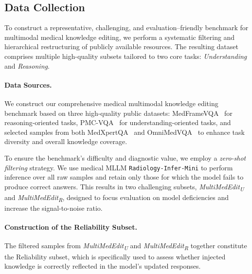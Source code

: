 \documentclass[letterpaper]{article} %
\begin{document}
\subsection{Data Collection}
To construct a representative, challenging, and evaluation–friendly benchmark for multimodal medical knowledge editing, we perform a systematic filtering and hierarchical restructuring of publicly available resources. The resulting dataset comprises multiple high-quality subsets tailored to two core tasks: \textit{Understanding} and \textit{Reasoning}.



\paragraph{Data Sources.}
We construct our comprehensive medical multimodal knowledge editing benchmark based on three high-quality public datasets: MedFrameVQA~\citep{liu2024medframeqa} for reasoning-oriented tasks, PMC-VQA~\citep{he2023pmcvqa} for understanding-oriented tasks, and selected samples from both MedXpertQA~\citep{cheng2024medxpertqa} and OmniMedVQA~\citep{huang2024omnimedvqa} to enhance task diversity and overall knowledge coverage.


To ensure the benchmark’s difficulty and diagnostic value, we employ a \textit{zero-shot filtering} strategy. We use medical MLLM \texttt{Radiology-Infer-Mini} to perform inference over all raw samples and retain only those for which the model fails to produce correct answers. This results in two challenging subsets, \textit{MultiMedEdit\textsubscript{U}} and \textit{MultiMedEdit\textsubscript{R}}, designed to focus evaluation on model deficiencies and increase the signal-to-noise ratio.


\paragraph{Construction of the Reliability Subset.}
The filtered samples from \textit{MultiMedEdit\textsubscript{U}} and \textit{MultiMedEdit\textsubscript{R}} together constitute the Reliability subset, which is specifically used to assess whether injected knowledge is correctly reflected in the model’s updated responses.
\end{document}
